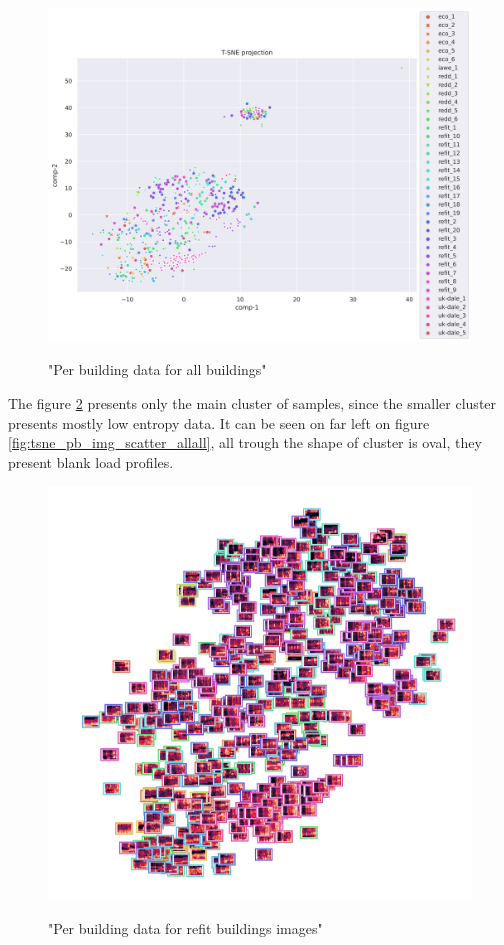 \begin{figure}[H]
	\centering
	\caption{"Per building data for all buildings"}
	\includegraphics[width=1.2\textwidth]{Figures/TSNE/TSNE_per_building/all/scatter_all_all.png}
	\label{fig:tsne_pb_scatter_all_all}
\end{figure}

The figure \ref{fig:tsne_pb_img_norm_scatter_allall} presents only the main cluster 
of samples, since the smaller cluster presents mostly low entropy data. It can be seen on 
far left on figure \ref{fig:tsne_pb_img_scatter_allall}, all trough the shape of cluster is 
oval, they present blank load profiles.
\begin{figure}[H]
	\centering
	\caption{"Per building data for refit buildings images"}
	\includegraphics[width=.9\textwidth]{Figures/TSNE/TSNE_per_building/all/img_scatter_allall.png}
	\label{fig:tsne_pb_img_norm_scatter_allall}
\end{figure}

